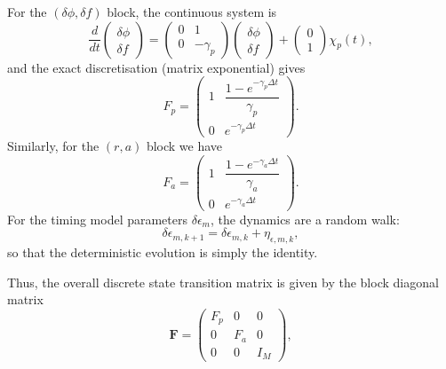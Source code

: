 \documentclass{tufte-handout} %
\begin{document}
	For the $\left(\delta\phi,\delta f\right)$ block, the continuous system is
	\begin{equation}
	\frac{d}{dt}\begin{pmatrix}\delta\phi \\ \delta f\end{pmatrix} 
	=
	\begin{pmatrix}
		0 & 1\\[1mm]
		0 & -\gamma_p
	\end{pmatrix}
	\begin{pmatrix}\delta\phi \\ \delta f\end{pmatrix}
	+
	\begin{pmatrix}0\\1\end{pmatrix}\chi_p(t),
	\end{equation}
	and the exact discretisation (matrix exponential) gives
	\begin{equation}
	F_p = \begin{pmatrix}
		1 & \dfrac{1-e^{-\gamma_p\Delta t}}{\gamma_p}\\[1mm]
		0 & e^{-\gamma_p\Delta t}
	\end{pmatrix}.
	\end{equation}
	Similarly, for the $\left(r,a\right)$ block we have
	\begin{equation}
	F_a = \begin{pmatrix}
		1 & \dfrac{1-e^{-\gamma_a\Delta t}}{\gamma_a}\\[1mm]
		0 & e^{-\gamma_a\Delta t}
	\end{pmatrix}.
	\end{equation}
For the timing model parameters $\delta\epsilon_m$, the dynamics are a random walk:
	\begin{equation}
	\delta\epsilon_{m,k+1} = \delta\epsilon_{m,k} + \eta_{\epsilon,m,k},
	\end{equation}
	so that the deterministic evolution is simply the identity. \newline 
	
	\noindent Thus, the overall discrete state transition matrix is given by the block diagonal matrix
	\begin{equation}
	\boldsymbol{F} = \begin{pmatrix}
		F_p & 0 & 0\\[1mm]
		0 & F_a & 0\\[1mm]
		0 & 0 & I_M
	\end{pmatrix},
	\end{equation}
\end{document}

